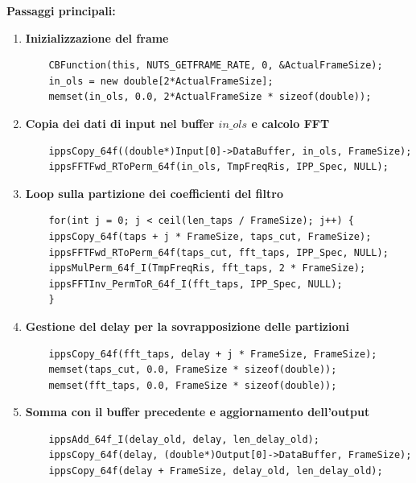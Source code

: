 \textbf{Passaggi principali:}

\begin{enumerate}
    \item \textbf{Inizializzazione del frame}
    \begin{verbatim}
    CBFunction(this, NUTS_GETFRAME_RATE, 0, &ActualFrameSize);
    in_ols = new double[2*ActualFrameSize];
    memset(in_ols, 0.0, 2*ActualFrameSize * sizeof(double));
    \end{verbatim}
    
    \item \textbf{Copia dei dati di input nel buffer $in\_ols$ e calcolo FFT}
    \begin{verbatim}
    ippsCopy_64f((double*)Input[0]->DataBuffer, in_ols, FrameSize);
    ippsFFTFwd_RToPerm_64f(in_ols, TmpFreqRis, IPP_Spec, NULL);
    \end{verbatim}
    
    \item \textbf{Loop sulla partizione dei coefficienti del filtro}
    \begin{verbatim}
    for(int j = 0; j < ceil(len_taps / FrameSize); j++) {
    ippsCopy_64f(taps + j * FrameSize, taps_cut, FrameSize);
    ippsFFTFwd_RToPerm_64f(taps_cut, fft_taps, IPP_Spec, NULL);
    ippsMulPerm_64f_I(TmpFreqRis, fft_taps, 2 * FrameSize);
    ippsFFTInv_PermToR_64f_I(fft_taps, IPP_Spec, NULL);
    }
    \end{verbatim}
    
    \item \textbf{Gestione del delay per la sovrapposizione delle partizioni}
    \begin{verbatim}
    ippsCopy_64f(fft_taps, delay + j * FrameSize, FrameSize);
    memset(taps_cut, 0.0, FrameSize * sizeof(double));
    memset(fft_taps, 0.0, FrameSize * sizeof(double));
    \end{verbatim}
    
    \item \textbf{Somma con il buffer precedente e aggiornamento dell'output}
    \begin{verbatim}
    ippsAdd_64f_I(delay_old, delay, len_delay_old);
    ippsCopy_64f(delay, (double*)Output[0]->DataBuffer, FrameSize);
    ippsCopy_64f(delay + FrameSize, delay_old, len_delay_old);
    \end{verbatim}
\end{enumerate}




